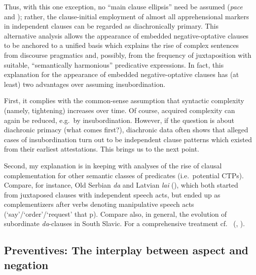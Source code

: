 \documentclass[output=paper,colorlinks,citecolor=brown]{langscibook}
\begin{document}
Thus, with this one exception, no ``main clause ellipsis'' need be assumed (\textit{pace} \citealt{Dobrushina2006wiemer} and \citealt{evans2007insubordination}); rather, the clause-initial employment of almost all apprehensional markers in independent clauses can be regarded as diachronically primary. This alternative analysis allows the appearance of embedded negative-optative clauses to be anchored to a unified basis which explains the rise of complex sentences from discourse pragmatics and, possibly, from the frequency of juxtaposition with suitable, ``semantically harmonious'' predicative expressions. In fact, this explanation for the appearance of embedded negative-optative clauses has (at least) two advantages over assuming insubordination.

First, it complies with the common-sense assumption that syntactic complexity (namely, tightening) increases over time. Of course, acquired complexity can again be reduced, e.g.\ by insubordination. However, if the question is about diachronic primacy (what comes first?), diachronic data often shows that alleged cases of insubordination turn out to be independent clause patterns which existed from their earliest attestations. This brings us to the next point.

Second, my explanation is in keeping with analyses of the rise of clausal complementation for other semantic classes of predicates (i.e.\ potential CTPs). Compare, for instance, Old Serbian \textit{da} \citep[198]{Grković-Major2004} and Latvian \textit{lai} (\citealt[237, 253, 260]{Holvoet2016}), which both started from juxtaposed clauses with independent speech acts, but ended up as complementizers after verbs denoting manipulative speech acts (`say'/`order'/`request' that p). Compare also, in general, the evolution of subordinate \textit{da}-clauses in South Slavic. For a comprehensive treatment cf.\ \citeauthor{Wiemer2017} (\citeyear[297--300, 313--315]{Wiemer2017}, \citeyear{Wiemer2019}).




\subsection{Preventives: The interplay between aspect and negation}
\label{subsec:preventives}
\end{document}
